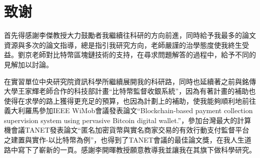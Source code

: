 
\chapter{致谢}
首先得感謝李傑教授大力鼓勵者我繼續往科研的方向前進，同時給予我最多的論文資源與多次的論文指導，總是指引我研究方向，老師嚴謹的治學態度使我終生受益。劉京老師對比特幣區塊鏈技術的支持，在尋求問題解答的過程中，給予不同的見解加以討論。

在實習單位中央研究院資訊科學所繼續展開我的科研路，同時也延續著之前與銘傳大學王家輝老師合作的科技部計畫“比特幣監督收銀系統”，因為有著計畫的補助也使得在求學的路上獲得更充足的預算，也因為計劃上的補助，使我能夠順利地前往義大利羅馬參加IEEE WiMob會議發表論文“Blockchain-based payment collection supervision system using pervasive Bitcoin digital wallet.”\supercite{Blockchain-basedpaymentcollectionsupervisionsystemusingpervasiveBitcoindigitalwallet}，參加台灣最大的計算機會議TANET發表論文“匿名加密貨幣與實名商家交易的有效行動支付監督平台之建置與實作-以比特幣為例”，也得到了TANET會議的最佳論文獎，在我人生道路中寫下了嶄新的一頁。感謝李開暉教授願意教導我並讓我在其旗下做科學研究。